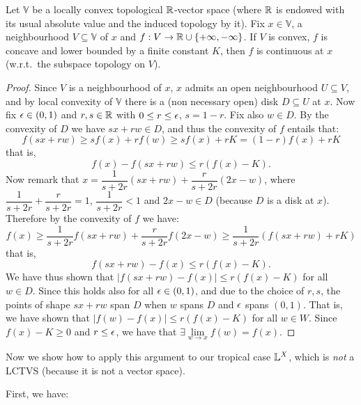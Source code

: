 \begin{proposition}\label{prop:mainLCTVS}
 Let $\mathbb{V}$ be a locally convex topological $\mathbb{R}$-vector space (where $\mathbb{R}$ is endowed with its usual absolute value and the induced topology by it).
 Fix $x\in\mathbb{V}$, a neighbourhood $V\subseteq\mathbb{V}$ of $x$ and $f:V\to \mathbb{R}\cup\{+\infty,-\infty\}$.
 If $V$ is convex, $f$ is concave and lower bounded by a finite constant $K$, then $f$ is continuous at $x$ (w.r.t.\ the subspace topology on $V$).
\end{proposition}
\begin{proof}
 Since $V$ is a neighbourhood of $x$, $x$ admits an open neighbourhood $U\subseteq V$, and by local convexity of $\mathbb{V}$ there is a (non necessary open) disk $D\subseteq U$ at $x$.
 Now fix $\epsilon\in(0,1)$ and $r,s\in \mathbb{R}$ with $0\leq r\leq\epsilon$, $s=1-r$.
 Fix also $w\in D$.
 By the convexity of $D$ we have $sx+rw\in D$, and thus the convexity of $f$ entails that:
 \[
  f(sx+rw)\geq s f(x) + r f(w) \geq s f(x) + r K = (1-r)f(x) + r K
 \]
that is,
 \[
  f(x)-f(sx+rw)\leq r (f(x)-K).
 \]
 Now remark that $x=\dfrac{1}{s+2r}(sx+rw)+\dfrac{r}{s+2r}(2x-w)$, where $\dfrac{1}{s+2r}+\dfrac{r}{s+2r}=1$, $\dfrac{1}{s+2r}<1$ and $2x-w\in D$ (because $D$ is a disk at $x$).
 Therefore by the convexity of $f$ we have:
 \[
  f(x)\geq \dfrac{1}{s+2r}f(sx+rw)+\dfrac{r}{s+2r}f(2x-w)\geq \dfrac{1}{s+2r}(f(sx+rw)+rK)
 \]
 that is,
 \[
  f(sx+rw)-f(x)\leq r(f(x)-K).
 \]
 We have thus shown that $\mid f(sx+rw)-f(x)\mid\leq r(f(x)-K)$ for all $w\in D$.
 Since this holds also for all $\epsilon\in(0,1)$, and due to the choice of $r,s$, the points of shape $sx+rw$ span $D$ when $w$ spans $D$ and $\epsilon$ spans $(0,1)$.
 That is, we have shown that $\mid f(w)-f(x)\mid\leq r(f(x)-K)$ for all $w\in W$.
 Since $f(x)-K\geq 0$ and $r\leq \epsilon$, we have that $\exists\lim\limits_{w\to x} f(w)=f(x)$.
\end{proof}

Now we show how to apply this argument to our tropical case $\mathbb{L}^X$, which is \emph{not} a LCTVS (because it is not a vector space).

First, we have:

